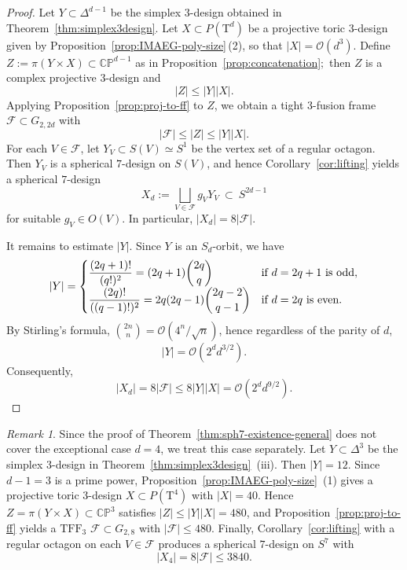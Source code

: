\documentclass{amsart}
\theoremstyle{definition}
\theoremstyle{remark}
\newtheorem{remark}[theorem]{Remark}
\numberwithin{equation}{section}
\newcommand{\CP}{\mathbb{CP}}
\newcommand{\TFF}{\mathrm{TFF}}
\newcommand{\order}{\mathcal{O}}
\begin{document}
\begin{proof}
Let $Y\subset\Delta^{d-1}$ be the simplex $3$-design obtained in
Theorem~\ref{thm:simplex3design}.
Let $X\subset P(\mathrm T^{d})$ be a projective toric $3$-design given by
Proposition~\ref{prop:IMAEG-poly-size}\,(2), so that $|X|=\mathcal O(d^3)$.
Define $Z:=\pi(Y\times X)\subset \CP^{d-1}$ as in Proposition~\ref{prop:concatenation}$;$ then $Z$ is a complex projective $3$-design and
\[
|Z|\le |Y||X|.
\]
Applying Proposition~\ref{prop:proj-to-ff} to $Z$, we obtain a tight $3$-fusion frame
\(
\mathcal F\subset G_{2,2d}
\)
with
\[
|\mathcal F|\le |Z|\le |Y||X|.
\]
For each $V\in\mathcal F$, let $Y_V\subset S(V)\simeq S^1$ be the vertex set of a regular octagon.
Then $Y_V$ is a spherical $7$-design on $S(V)$, and hence Corollary~\ref{cor:lifting} yields a spherical $7$-design
\[
X_d:=\bigsqcup_{V\in\mathcal F} g_V Y_V \ \subset\ S^{2d-1}
\]
for suitable $g_V\in O(V)$.
In particular, $|X_d|=8|\mathcal F|$.

It remains to estimate $|Y|$.
Since $Y$ is an $S_d$-orbit, we have
\[
|Y|=
\begin{cases}
\dfrac{(2q+1)!}{(q!)^2}=(2q+1)\dbinom{2q}{q}
& \text{if } d=2q+1\text{ is odd},\\[2mm]
\dfrac{(2q)!}{((q-1)!)^2}=2q(2q-1)\dbinom{2q-2}{q-1}
& \text{if } d=2q \text{ is even}.
\end{cases}
\]
By Stirling's formula, $\binom{2n}{n}=\order(4^n/\sqrt n)$, hence regardless of the parity of $d$,
\[
|Y|=\mathcal O\!\left(2^{d}d^{3/2}\right).
\]
Consequently,
\[
|X_d|
=8|\mathcal F|
\le 8|Y||X|
=\mathcal O\!\left(2^{d}d^{9/2}\right).
\]
\end{proof}

\begin{remark}
Since the proof of Theorem~\ref{thm:sph7-existence-general} does not cover the exceptional case $d=4$, we treat this case separately.
Let $Y\subset\Delta^{3}$ be the simplex $3$-design in Theorem~\ref{thm:simplex3design}~(iii). Then $|Y|=12$.
Since $d-1=3$ is a prime power, Proposition~\ref{prop:IMAEG-poly-size}~(1) gives a projective toric $3$-design
$X\subset P(\mathrm T^{4})$ with $|X|=40$.
Hence $Z=\pi(Y\times X)\subset\CP^{3}$ satisfies $|Z|\le |Y||X|=480$, and Proposition~\ref{prop:proj-to-ff} yields a $\TFF_3$
$\mathcal F\subset G_{2,8}$ with $|\mathcal F|\le 480$.
Finally, Corollary~\ref{cor:lifting} with a regular octagon on each $V\in\mathcal F$ produces a spherical $7$-design on $S^{7}$ with
\[
|X_4|=8|\mathcal F|\le 3840.
\]
\end{remark}
\end{document}

